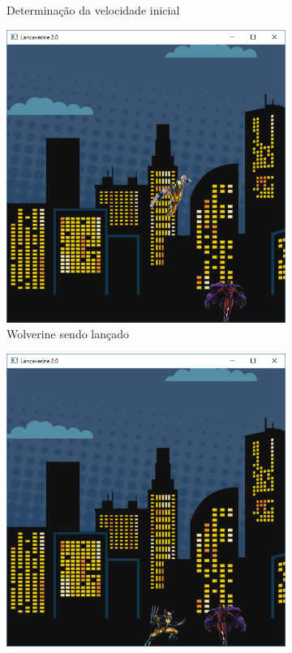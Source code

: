 \begin{enumerate}
\begin{figure}[!htp]
\begin{subfigure}[b]{0.3\textwidth}
        \caption{Determinação da velocidade inicial}
        \label{fig:cap03_ex27b}
    \end{subfigure}
    \hfill
    \begin{subfigure}[b]{0.3\textwidth}
        \centerline{\includegraphics[width=.9\textwidth]{img/cap3_ex27c}}
        \caption{Wolverine sendo lançado}
        \label{fig:cap03_ex27c}
    \end{subfigure}
    \hfill
    \begin{subfigure}[b]{0.3\textwidth}
        \centerline{\includegraphics[width=.9\textwidth]{img/cap3_ex27d}}

\end{subfigure}
\end{figure}
\end{enumerate}
